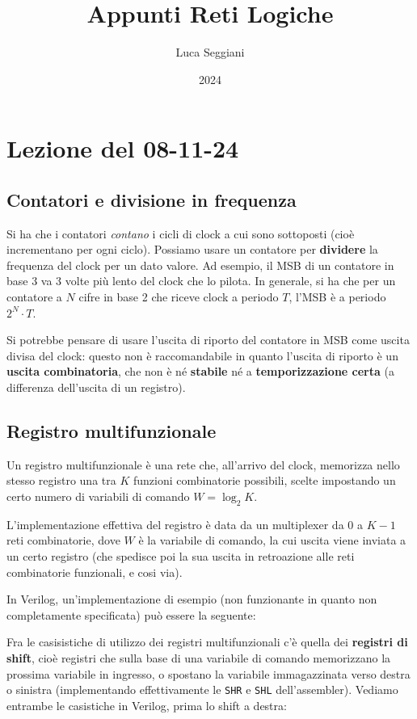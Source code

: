 \documentclass[a4paper,11pt]{article}
\title{Appunti Reti Logiche}
\author{Luca Seggiani}
\date{2024}
\begin{document}
\section{Lezione del 08-11-24}

\thispagestyle{empty}
\pagestyle{fancy}

\subsection{Contatori e divisione in frequenza}
Si ha che i contatori \textit{contano} i cicli di clock a cui sono sottoposti (cioè incrementano per ogni ciclo).
Possiamo usare un contatore per \textbf{dividere} la frequenza del clock per un dato valore.
Ad esempio, il MSB di un contatore in base 3 va 3 volte più lento del clock che lo pilota.
In generale, si ha che per un contatore a $N$ cifre in base 2 che riceve clock a periodo $T$, l'MSB è a periodo $2^N \cdot T$.

Si potrebbe pensare di usare l'uscita di riporto del contatore in MSB come uscita divisa del clock: questo non è raccomandabile in quanto l'uscita di riporto è un \textbf{uscita combinatoria}, che non è né \textbf{stabile} né a \textbf{temporizzazione certa} (a differenza dell'uscita di un registro).

\subsection{Registro multifunzionale}
Un registro multifunzionale è una rete che, all'arrivo del clock, memorizza nello stesso registro una tra $K$ funzioni combinatorie possibili, scelte impostando un certo numero di variabili di comando $W = \log_2 K$.

L'implementazione effettiva del registro è data da un multiplexer da $0$ a $K-1$ reti combinatorie, dove $W$ è la variabile di comando, la cui uscita viene inviata a un certo registro (che spedisce poi la sua uscita in retroazione alle reti combinatorie funzionali, e cosi via).

In Verilog, un'implementazione di esempio (non funzionante in quanto non completamente specificata) può essere la seguente:



Fra le casisistiche di utilizzo dei registri multifunzionali c'è quella dei \textbf{registri di shift}, cioè registri che sulla base di una variabile di comando memorizzano la prossima variabile in ingresso, o spostano la variabile immagazzinata verso destra o sinistra (implementando effettivamente le \lstinline|SHR| e \lstinline|SHL| dell'assembler).
Vediamo entrambe le casistiche in Verilog, prima lo shift a destra:
\end{document}
